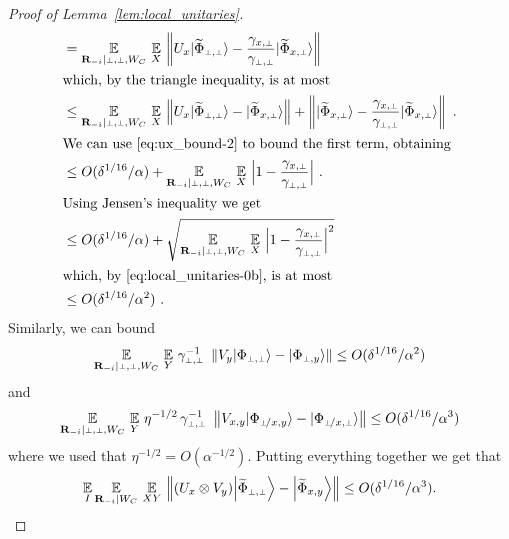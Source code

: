 \begin{proof}[Proof of Lemma~\ref{lem:local_unitaries}]
\begin{align*}
	&= 	\Ex_{\bR_\mi | \dummy, \dummy, W_C} \, \Ex_X \, \left \|  U_x \ket{\wt{\Phi}_{\dummy,\dummy}} -  \frac{\gamma_{\xp}}{\gamma_\pp} \ket{\wt{\Phi}_{x,\dummy}} \right \|\\
	\intertext{which, by the triangle inequality, is at most}
	&\leq  \Ex_{\bR_\mi | \dummy, \dummy, W_C} \, \Ex_X \, \left \|  U_x \ket{\wt{\Phi}_{\dummy,\dummy}} - \ket{\wt{\Phi}_{x,\dummy}} \right \| + \left \| \ket{\wt{\Phi}_{x,\dummy}} - \frac{\gamma_{\xp}}{\gamma_\pp} \ket{\wt{\Phi}_{x,\dummy}}\right \|~. \\
	\intertext{We can use~\eqref{eq:ux_bound-2} to bound the first term, obtaining}
	&\leq O(\delta^{1/16}/\alpha) + \Ex_{\bR_\mi | \dummy, \dummy, W_C} \, \Ex_X \, \Big | 1 - \frac{\gamma_{\xp}}{\gamma_\pp} \Big |~. \\
	\intertext{Using Jensen's inequality we get}
	&\leq O(\delta^{1/16}/\alpha) + \sqrt{\Ex_{\bR_\mi | \dummy, \dummy, W_C} \, \Ex_X \, \Big | 1 - \frac{\gamma_{\xp}}{\gamma_\pp} \Big |^2} \\
	\intertext{which, by~\eqref{eq:local_unitaries-0b}, is at most}
	&\leq O(\delta^{1/16}/\alpha^2)~.
\end{align*}
Similarly, we can bound
\[
\Ex_{\bR_\mi | \dummy, \dummy, W_C} \, \Ex_Y \, \gamma_\pp^{-1} \,\, \left \|  V_y \ket{{\Phi}_{\dummy,\dummy}} -  \ket{{\Phi}_\py} \right \| 	\leq O(\delta^{1/16}/\alpha^2)
\]
and
\[
\Ex_{\bR_\mi | \dummy, \dummy, W_C} \, \Ex_Y \, \eta^{-1/2} \, \gamma_\pp^{-1} \,\, \left \|  V_{x,y} \ket{{\Phi}_{\pxy}} -  \ket{{\Phi}_\pxp} \right \| 	\leq O(\delta^{1/16}/\alpha^3)
\]
where we used that $\eta^{-1/2} = O(\alpha^{-1/2})$. 
Putting everything together we get that 
\[
\Ex_I \Ex_{\bR_\mi |  W_C} \, \Ex_{XY} \, \left \| (U_{x} \otimes V_{y}) \bigket{\wt{\Phi}_{\pp}} - \bigket{\wt{\Phi}_{\xy}} \right\| \leq O(\delta^{1/16}/\alpha^3).
\]


\end{proof}
